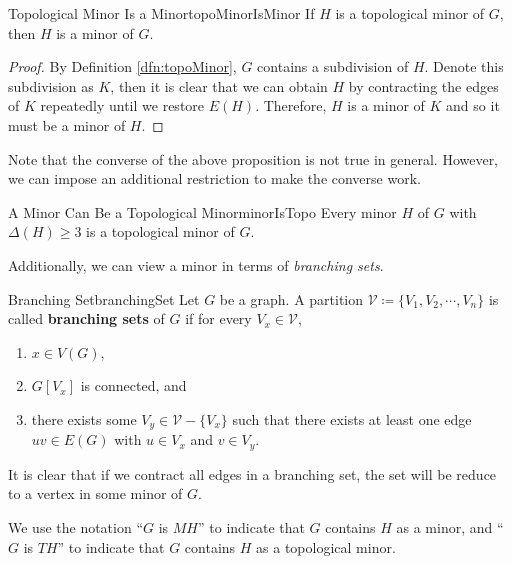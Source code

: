 \documentclass[math]{amznotes}
\theoremstyle{remark}
\newcommand{\0}{\mathbf{0}}
\newcommand{\1}{\mathbf{1}}
\begin{document}
\begin{probox}{Topological Minor Is a Minor}{topoMinorIsMinor}
    If $H$ is a topological minor of $G$, then $H$ is a minor of $G$.
    \tcblower
    \begin{proof}
        By Definition \ref{dfn:topoMinor}, $G$ contains a subdivision of $H$. Denote this subdivision as $K$, then it is clear that we can obtain $H$ by contracting the edges of $K$ repeatedly until we restore $E(H)$. Therefore, $H$ is a minor of $K$ and so it must be a minor of $H$.
    \end{proof}
\end{probox}
Note that the converse of the above proposition is not true in general. However, we can impose an additional restriction to make the converse work.
\begin{probox}{A Minor Can Be a Topological Minor}{minorIsTopo}
    Every minor $H$ of $G$ with $\Delta(H) \geq 3$ is a topological minor of $G$.
\end{probox}
Additionally, we can view a minor in terms of \textit{branching sets}.
\begin{dfnbox}{Branching Set}{branchingSet}
    Let $G$ be a graph. A partition $\mathcal{V} \coloneqq \{V_1, V_2, \cdots, V_n\}$ is called {\color{red} \textbf{branching sets}} of $G$ if for every $V_x \in \mathcal{V}$,
    \begin{enumerate}
        \item $x \in V(G)$,
        \item $G[V_x]$ is connected, and
        \item there exists some $V_y \in \mathcal{V} - \{V_x\}$ such that there exists at least one edge $uv \in E(G)$ with $u \in V_x$ and $v \in V_y$.
    \end{enumerate}
\end{dfnbox}
It is clear that if we contract all edges in a branching set, the set will be reduce to a vertex in some minor of $G$. 

We use the notation ``$G$ is $MH$'' to indicate that $G$ contains $H$ as a minor, and ``$G$ is $TH$'' to indicate that $G$ contains $H$ as a topological minor.
\end{document}
